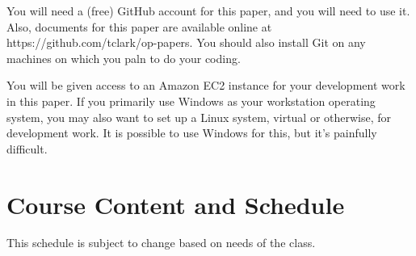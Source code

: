 \documentclass{article}
\begin{document}
You will need a (free) GitHub account for this paper, and you will need to use it.  Also, documents for this paper are available online at https://github.com/tclark/op-papers. You should also install Git on any machines on which you paln to do your coding.

You will be given access to an Amazon EC2 instance for your development work in this paper.  If you primarily use Windows as your workstation operating system, you may also want to set up a Linux system, virtual or otherwise, for development work.  It is possible to use Windows for this, but it's painfully difficult.

\newpage

\section*{Course Content and Schedule}
This schedule is subject to change based on needs of the class.
\end{document}
